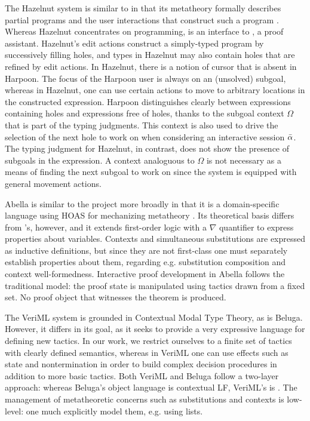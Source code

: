 The Hazelnut system is similar to \Harpoon{} in that its metatheory formally
describes partial programs and the user interactions that construct such a
program \cite{hazelnut}.
Whereas Hazelnut concentrates on programming, \Harpoon{} is an interface to
\Beluga, a proof assistant. Hazelnut's edit actions construct a simply-typed
program by successively filling holes, and types in Hazelnut may also contain
holes that are refined by edit actions.
In Hazelnut, there is a notion of cursor that is absent in Harpoon.
The focus of the Harpoon user is always on an (unsolved) subgoal, whereas in
Hazelnut, one can use certain actions to move to arbitrary locations in the
constructed expression.
Harpoon distinguishes clearly between expressions containing holes and
expressions free of holes, thanks to the subgoal context $\Omega$ that is part
of the typing judgments.
This context is also used to drive the selection of the next hole to work on
when considering an interactive session $\bar{\alpha}$.
The typing judgment for Hazelnut, in contrast, does not show the presence of
subgoals in the expression. A context analoguous to $\Omega$ is not necessary
as a means of finding the next subgoal to work on since the system is equipped
with general movement actions.

Abella is similar to the \Beluga{} project more broadly in that it is a
domain-specific language using HOAS for mechanizing metatheory
\cite{Gacek:IJCAR08, Gacek:JAR12}.
Its theoretical basis differs from \Beluga's, however, and it extends
first-order logic with a $\nabla$ quantifier to express properties about
variables. Contexts and simultaneous substitutions are expressed as inductive
definitions, but since they are not first-class one must separately establish
properties about them, regarding e.g. substitution composition and context
well-formedness. Interactive proof development in Abella follows the traditional
model: the proof state is manipulated using tactics drawn from a fixed set. No
proof object that witnesses the theorem is produced.

The VeriML system is grounded in Contextual Modal Type Theory, as is Beluga.
However, it differs in its goal, as it seeks to provide a very expressive
language for defining new tactics.
In our work, we restrict ourselves to a finite set of tactics with clearly
defined semantics, whereas in VeriML one can use effects such as state and
nontermination in order to build complex decision procedures in addition to more
basic tactics.
Both VeriML and Beluga follow a two-layer approach: whereas Beluga's object
language is contextual LF, VeriML's is \lhol.
The management of metatheoretic concerns such as substitutions and contexts is
low-level: one much explicitly model them, e.g. using lists.

